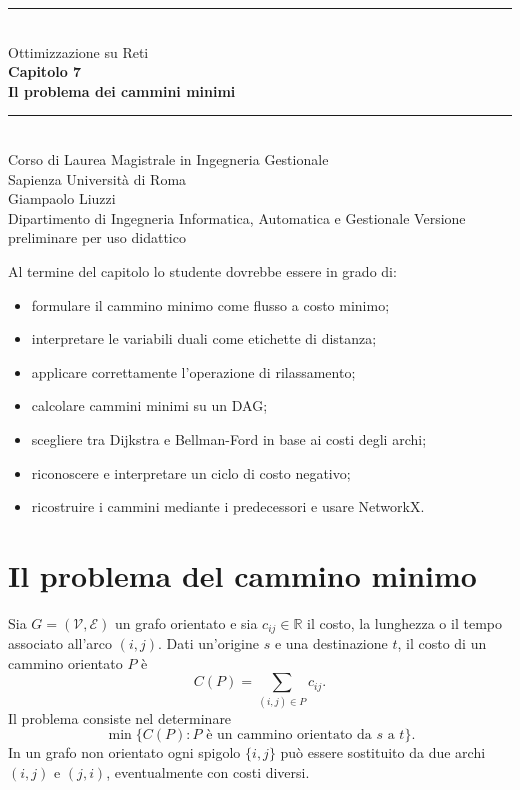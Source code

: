 \documentclass[11pt,a4paper]{article}
\newcommand{\V}{\mathcal{V}}
\newcommand{\E}{\mathcal{E}}
\newcommand{\R}{\mathbb{R}}
\begin{document}
\hypersetup{pageanchor=false}
\begin{titlepage}
\centering\vspace*{1.6cm}
{\color{sapienzared}\rule{\textwidth}{1.2pt}}\\[1.1cm]
{\Large Ottimizzazione su Reti}\\[0.35cm]
{\huge\bfseries Capitolo 7}\\[0.45cm]
{\LARGE\bfseries Il problema dei cammini minimi}\\[1.1cm]
{\color{sapienzared}\rule{0.72\textwidth}{0.8pt}}\\[1.1cm]
{\large Corso di Laurea Magistrale in Ingegneria Gestionale}\\[0.25cm]
{\large Sapienza Università di Roma}\\[1.2cm]
{\large Giampaolo Liuzzi}\\[0.25cm]
{\normalsize Dipartimento di Ingegneria Informatica, Automatica e Gestionale}
\vfill{\small Versione preliminare per uso didattico}
\end{titlepage}
\hypersetup{pageanchor=true}
\tableofcontents\newpage{}

\begin{learningbox}
Al termine del capitolo lo studente dovrebbe essere in grado di:
\begin{itemize}[nosep]
\item formulare il cammino minimo come flusso a costo minimo;
\item interpretare le variabili duali come etichette di distanza;
\item applicare correttamente l'operazione di rilassamento;
\item calcolare cammini minimi su un DAG;
\item scegliere tra Dijkstra e Bellman-Ford in base ai costi degli archi;
\item riconoscere e interpretare un ciclo di costo negativo;
\item ricostruire i cammini mediante i predecessori e usare NetworkX.
\end{itemize}
\end{learningbox}

\section{Il problema del cammino minimo}

Sia $G=(\V,\E)$ un grafo orientato e sia $c_{ij}\in\R$ il costo, la lunghezza o il tempo associato all'arco $(i,j)$. Dati un'origine $s$ e una destinazione $t$, il costo di un cammino orientato $P$ è
\[
C(P)=\sum_{(i,j)\in P}c_{ij}.
\]
Il problema consiste nel determinare
\[
\min\{C(P):P\text{ è un cammino orientato da }s\text{ a }t\}.
\]
In un grafo non orientato ogni spigolo $\{i,j\}$ può essere sostituito da due archi $(i,j)$ e $(j,i)$, eventualmente con costi diversi.
\end{document}

